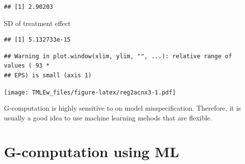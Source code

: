 \documentclass[
]{book}
\newenvironment{Shaded}{\begin{snugshade}}{\end{snugshade}}
\newcommand{\AttributeTok}[1]{\textcolor[rgb]{0.77,0.63,0.00}{#1}}
\newcommand{\DecValTok}[1]{\textcolor[rgb]{0.00,0.00,0.81}{#1}}
\newcommand{\FunctionTok}[1]{\textcolor[rgb]{0.00,0.00,0.00}{#1}}
\newcommand{\NormalTok}[1]{#1}
\newcommand{\SpecialCharTok}[1]{\textcolor[rgb]{0.00,0.00,0.00}{#1}}
\newcommand{\StringTok}[1]{\textcolor[rgb]{0.31,0.60,0.02}{#1}}
\begin{document}
\begin{verbatim}
## [1] 2.90203
\end{verbatim}

SD of treatment effect

\begin{Shaded}
\end{Shaded}

\begin{verbatim}
## [1] 5.132733e-15
\end{verbatim}

\begin{Shaded}
\end{Shaded}

\begin{verbatim}
## Warning in plot.window(xlim, ylim, "", ...): relative range of values ( 93 *
## EPS) is small (axis 1)
\end{verbatim}

\begin{Shaded}
\end{Shaded}

\texttt{[image: TMLEw\_files/figure-latex/reg2acnx3-1.pdf]}

G-computation is highly sensitive to on model misspecification. Therefore, it is usually a good idea to use machine learning mehods that are flexible.

\hypertarget{g-computation-using-ml}{%
\section{G-computation using ML}\label{g-computation-using-ml}}
\end{document}
